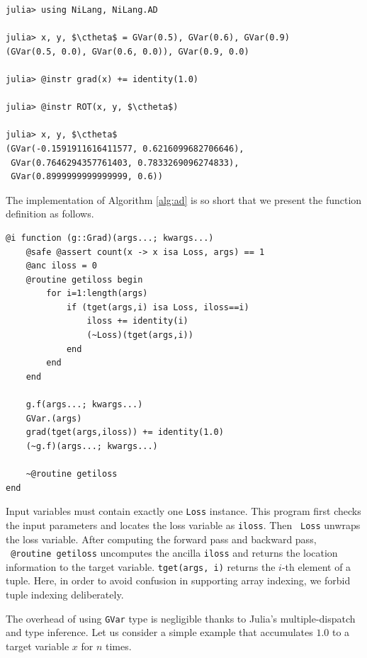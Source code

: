 \documentclass[aps,twocolumn,longbibliography,english,superscriptaddress]{revtex4-1}
\newcommand{\<}{\langle}
\renewcommand{\>}{\rangle}
\newcommand{\ctheta}{{\color{jlbase}{\rm \theta}}}
\theoremstyle{definition}\newtheorem{definition}{\textit{Definition}}
\begin{document}
\begin{minipage}{.44\textwidth}
    \begin{lstlisting}[mathescape=true]
julia> using NiLang, NiLang.AD

julia> x, y, $\ctheta$ = GVar(0.5), GVar(0.6), GVar(0.9)
(GVar(0.5, 0.0), GVar(0.6, 0.0)), GVar(0.9, 0.0)

julia> @instr grad(x) += identity(1.0)

julia> @instr ROT(x, y, $\ctheta$)

julia> x, y, $\ctheta$
(GVar(-0.1591911616411577, 0.6216099682706646),
 GVar(0.7646294357761403, 0.7833269096274833),
 GVar(0.8999999999999999, 0.6))
\end{lstlisting}
\end{minipage}


The implementation of Algorithm \ref{alg:ad} is so short that we present the function definition as follows.

\begin{minipage}{.44\textwidth}
\begin{lstlisting}
@i function (g::Grad)(args...; kwargs...)
    @safe @assert count(x -> x isa Loss, args) == 1
    @anc iloss = 0
    @routine getiloss begin
        for i=1:length(args)
            if (tget(args,i) isa Loss, iloss==i)
                iloss += identity(i)
                (~Loss)(tget(args,i))
            end
        end
    end

    g.f(args...; kwargs...)
    GVar.(args)
    grad(tget(args,iloss)) += identity(1.0)
    (~g.f)(args...; kwargs...)

    ~@routine getiloss
end
\end{lstlisting}
\end{minipage}

Input variables must contain exactly one \texttt{Loss} instance.
This program first checks the input parameters and locates the loss variable as \texttt{iloss}. Then \texttt{~Loss} unwraps the loss variable.
After computing the forward pass and backward pass, \texttt{~@routine getiloss} uncomputes the ancilla \texttt{iloss} and returns the location information to the target variable.
\texttt{tget(args, i)} returns the $i$-th element of a tuple.
Here, in order to avoid confusion in supporting array indexing, we forbid tuple indexing deliberately.

The overhead of using \texttt{GVar} type is negligible thanks to Julia's multiple-dispatch and type inference. Let us consider a simple example that accumulates $1.0$ to a target variable $x$ for $n$ times.
\end{document}
